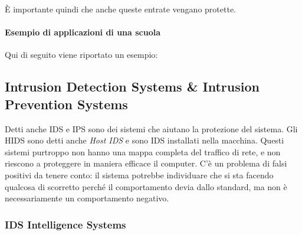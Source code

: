 È importante quindi che anche queste entrate vengano protette.

\paragraph*{Esempio di applicazioni di una scuola}

Qui di seguito viene riportato un esempio:

\begin{table}[H]
\centering
{}
\caption{Un esempio di diversi canali di accesso logici per una infrastruttura
universitaria}
\end{table}

\subsection{Intrusion Detection Systems \& Intrusion Prevention Systems}

Detti anche IDS e IPS sono dei sistemi che aiutano la protezione del sistema.
Gli HIDS sono detti anche \textit{Host IDS} e sono IDS installati nella
macchina. Questi sistemi purtroppo non hanno una mappa completa del traffico di
rete, e non riescono a proteggere in maniera efficace il computer. C'è un
problema di falsi positivi da tenere conto: il sistema potrebbe individuare che
si sta facendo qualcosa di scorretto perché il comportamento devia dallo
standard, ma non è necessariamente un comportamento negativo.

\subsubsection{IDS Intelligence Systems}

